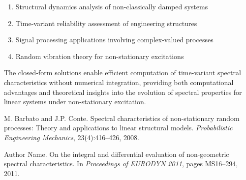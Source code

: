 \documentclass[12pt,a4paper]{article}
\begin{document}
\begin{enumerate}[label=(\arabic*)]
\item Structural dynamics analysis of non-classically damped systems
\item Time-variant reliability assessment of engineering structures
\item Signal processing applications involving complex-valued processes
\item Random vibration theory for non-stationary excitations
\end{enumerate}

The closed-form solutions enable efficient computation of time-variant spectral characteristics without numerical integration, providing both computational advantages and theoretical insights into the evolution of spectral properties for linear systems under non-stationary excitation.

\begin{thebibliography}{9}
 M. Barbato and J.P. Conte. Spectral characteristics of non-stationary random processes: Theory and applications to linear structural models. \textit{Probabilistic Engineering Mechanics}, 23(4):416--426, 2008.

 Author Name. On the integral and differential evaluation of non-geometric spectral characteristics. In \textit{Proceedings of EURODYN 2011}, pages MS16--294, 2011.
\end{thebibliography}
\end{document}

